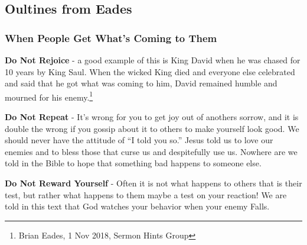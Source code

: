 \subsection{Oultines from Eades}

\subsubsection{When People Get What's Coming to Them}
\begin{compactenum}[I.][5]
    \item \textbf{Do Not Rejoice} - a good example of this is King David when he was chased for 10 years by King Saul. When the wicked King died and everyone else celebrated and said that he got what was coming to him, David remained humble and mourned for his enemy.\footnote{Brian Eades, 1 Nov 2018, Sermon Hints Group}
    \item \textbf{Do Not Repeat} - It's wrong for you to get joy out of anothers sorrow, and it is double the wrong if you gossip about it to others to make yourself look good. We should never have the attitude of ``I told you so.'' Jesus told us to love our enemies and to bless those that curse us and despitefully use us. Nowhere are we told in the Bible to hope that something bad happens to someone else.
    \item \textbf{Do Not Reward Yourself} - Often it is not what happens to others that is their test, but rather what happens to them maybe a test on your reaction! We are told in this text that God watches your behavior when your enemy Falls.
\end{compactenum}

